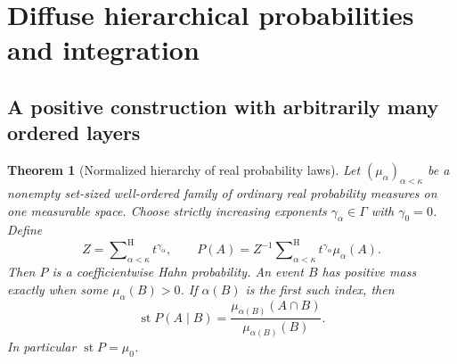 \documentclass[11pt,a4paper]{article}
\numberwithin{equation}{section}
\newtheorem{theorem}{Theorem}[section]
\theoremstyle{definition}
\theoremstyle{remark}
\newcommand{\st}{\operatorname{st}}
\newcommand{\hsum}{\mathop{\sum}\nolimits^{\mathrm H}}
\begin{document}
\section{Diffuse hierarchical probabilities and integration}
\label{fsp:sec:hierarchy}

\subsection{A positive construction with arbitrarily many ordered layers}

\begin{theorem}[Normalized hierarchy of real probability laws]
\label{fsp:thm:hierarchy}
Let $(\mu_\alpha)_{\alpha<\kappa}$ be a nonempty set-sized well-ordered
family of ordinary real probability measures on one measurable space.
Choose strictly increasing exponents $\gamma_\alpha\in\Gamma$ with
$\gamma_0=0$. Define
\begin{equation}\label{fsp:eq:hierarchy}
 Z=\hsum_{\alpha<\kappa}t^{\gamma_\alpha},\qquad
 P(A)=Z^{-1}\hsum_{\alpha<\kappa}t^{\gamma_\alpha}\mu_\alpha(A).
\end{equation}
Then $P$ is a coefficientwise Hahn probability. An event $B$ has positive
mass exactly when some $\mu_\alpha(B)>0$. If $\alpha(B)$ is the first
such index, then
\begin{equation}\label{fsp:eq:hierconditional}
 \st P(A\mid B)
 =\frac{\mu_{\alpha(B)}(A\cap B)}{\mu_{\alpha(B)}(B)}.
\end{equation}
In particular $\st P=\mu_0$.
\end{theorem}
\end{document}
